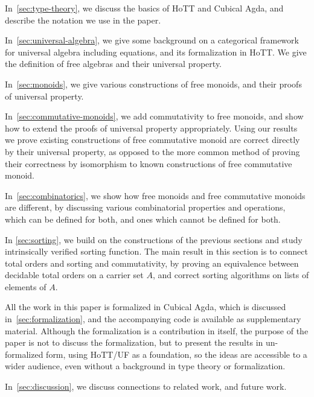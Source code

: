 \begin{myitemize}
  \item In~\cref{sec:type-theory}, we discuss the basics of HoTT and Cubical Agda, and describe the notation we use in the paper.
  \item In~\cref{sec:universal-algebra}, we give some background on a categorical framework for universal algebra including equations, and its formalization in HoTT. We give the definition of free algebras and their universal property.
  \item In~\cref{sec:monoids}, we give various constructions of free monoids, and their proofs of universal property.
  \item In~\cref{sec:commutative-monoids}, we add commutativity to free monoids, and show how to extend the proofs of universal property appropriately. Using our results we prove existing constructions
  of free commutative monoid are correct directly by their universal property, as opposed to
  the more common method of proving their correctness by isomorphism to known constructions
  of free commutative monoid.
  \item In~\cref{sec:combinatorics}, we show how free monoids and free commutative monoids are different, by discussing various combinatorial properties and operations, which can be defined for both, and ones which cannot be defined for both.
  \item In \cref{sec:sorting}, we build on the constructions of the previous sections and study intrinsically verified sorting function. The main result in this section is to connect total orders and sorting and commutativity, by proving an equivalence between decidable total orders on a carrier set $A$, and correct sorting algorithms on lists of elements of $A$.
  \item All the work in this paper is formalized in Cubical Agda, which is discussed in~\cref{sec:formalization}, and the accompanying code is available as supplementary material. Although the formalization is a contribution in itself, the purpose of the paper is not to discuss the formalization, but to present the results in un-formalized form, using HoTT/UF as a foundation, so the ideas are accessible to a wider audience, even without a background in type theory or formalization.
  \item In~\cref{sec:discussion}, we discuss connections to related work, and future work.
\end{myitemize}
